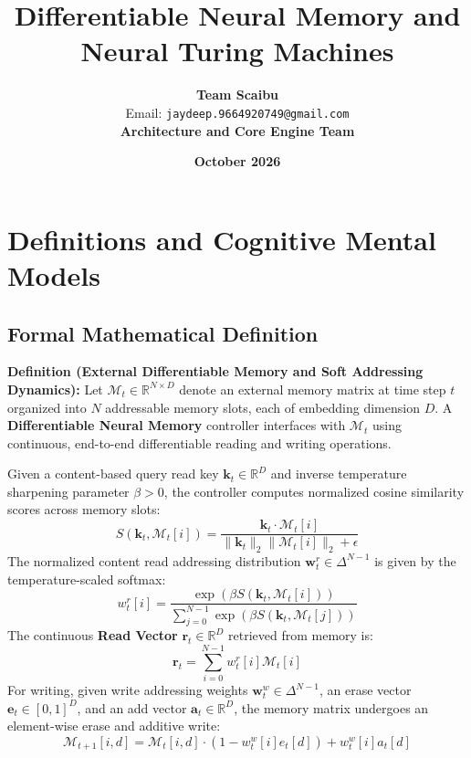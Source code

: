 \documentclass[11pt,a4paper]{article}
\title{\textbf{Differentiable Neural Memory and Neural Turing Machines}}
\author{\textbf{Team Scaibu} \\ \small Email: \texttt{jaydeep.9664920749@gmail.com} \\ \small \textbf{Architecture and Core Engine Team}}
\date{\textbf{October 2026}}
\theoremstyle{definition}
\begin{document}
\maketitle

\section{Definitions and Cognitive Mental Models}

\subsection{Formal Mathematical Definition}
\textbf{Definition (External Differentiable Memory and Soft Addressing Dynamics):}
Let $\mathcal{M}_t \in \mathbb{R}^{N \times D}$ denote an external memory matrix at time step $t$ organized into $N$ addressable memory slots, each of embedding dimension $D$. A \textbf{Differentiable Neural Memory} controller interfaces with $\mathcal{M}_t$ using continuous, end-to-end differentiable reading and writing operations.

Given a content-based query read key $\mathbf{k}_t \in \mathbb{R}^D$ and inverse temperature sharpening parameter $\beta > 0$, the controller computes normalized cosine similarity scores across memory slots:
{\boldmath
\begin{equation}
S(\mathbf{k}_t, \mathcal{M}_t[i]) = \frac{\mathbf{k}_t \cdot \mathcal{M}_t[i]}{\|\mathbf{k}_t\|_2 \|\mathcal{M}_t[i]\|_2 + \epsilon}
\end{equation}
}
The normalized content read addressing distribution $\mathbf{w}_t^r \in \Delta^{N-1}$ is given by the temperature-scaled softmax:
{\boldmath
\begin{equation}
w_t^r[i] = \frac{\exp\left( \beta S(\mathbf{k}_t, \mathcal{M}_t[i]) \right)}{\sum_{j=0}^{N-1} \exp\left( \beta S(\mathbf{k}_t, \mathcal{M}_t[j]) \right)}
\end{equation}
}
The continuous \textbf{Read Vector} $\mathbf{r}_t \in \mathbb{R}^D$ retrieved from memory is:
{\boldmath
\begin{equation}
\mathbf{r}_t = \sum_{i=0}^{N-1} w_t^r[i] \mathcal{M}_t[i]
\end{equation}
}
For writing, given write addressing weights $\mathbf{w}_t^w \in \Delta^{N-1}$, an erase vector $\mathbf{e}_t \in [0, 1]^D$, and an add vector $\mathbf{a}_t \in \mathbb{R}^D$, the memory matrix undergoes an element-wise erase and additive write:
{\boldmath
\begin{equation}
\mathcal{M}_{t+1}[i, d] = \mathcal{M}_t[i, d] \cdot \left( 1 - w_t^w[i] e_t[d] \right) + w_t^w[i] a_t[d]
\end{equation}
}
\end{document}
